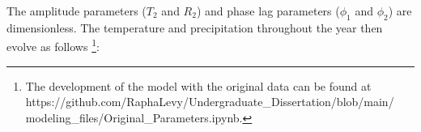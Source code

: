 \vspace{1cm}
The amplitude parameters ($T_2$ and $R_2$) and phase lag 
parameters ($\phi_1$ and $\phi_2$) are dimensionless. 
The temperature and precipitation throughout the year 
then evolve as follows
\footnote{The development of the model with the original data can be found at 
https://github.com/RaphaLevy/Undergraduate\_Dissertation/blob/main/
\\modeling\_files/Original\_Parameters.ipynb.}:



